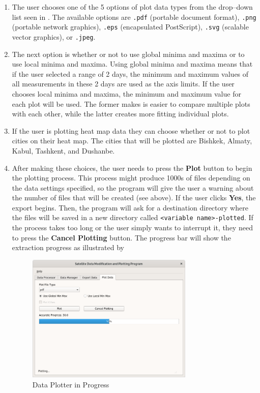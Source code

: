 \documentclass[../00_main.tex]{subfiles}
\begin{document}
\begin{enumerate}
    \item The user chooses one of the 5 options of plot data
        types from the drop--down list seen in . The available
        options are \texttt{.pdf} (portable document format), \texttt{.png}
        (portable network graphics), \texttt{.eps} (encapsulated PostScript), 
        \texttt{.svg} (scalable vector graphics), or \texttt{.jpeg}. 
    \item The next option is whether or not to use global minima and maxima or
        to use local minima and maxima. Using global minima and maxima means
        that if the user selected a range of 2 days, the minimum and maximum 
        values of all measurements in these 2 days are used as the axis limits.
        If the user chooses local minima and maxima, the minimum and maximum
        value for each plot will be used. The former makes is easier
        to compare multiple plots with each other, while the latter creates
        more fitting individual plots.
    \item If the user is plotting heat map data they can choose whether or not
        to plot cities on their heat map. The cities that will be plotted are
        Bishkek, Almaty, Kabul, Tashkent, and Dushanbe.
    \item After making these choices, the user needs to press the
        \textbf{Plot} button to begin the plotting process. This
        process might produce 1000s of files depending on the data settings
        specified, so the program will give the user a warning about the number 
        of files that will be created (see  above). 
        If the user clicks \textbf{Yes}, the
        export begins. Then, the program will ask for a destination directory 
        where the files
        will be saved in a new directory called \texttt{<variable
        name>-plotted}. If the process
        takes too long or the user simply wants to interrupt it, they need to
        press the \textbf{Cancel Plotting} button. The progress bar will show the
        extraction progress as illustrated by 
        \begin{figure}[H]
            \center
            \includegraphics[width=0.75\textwidth]{../graphics/dpl03}
            \caption{Data Plotter in Progress}
            \label{dpl03}
        \end{figure}
\end{enumerate}
\end{document}
